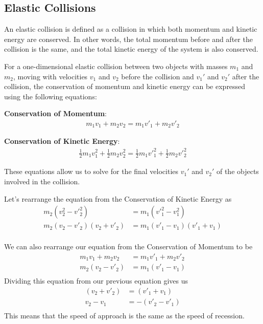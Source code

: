 \documentclass[11pt]{article}
\begin{document}
\subsection{Elastic Collisions}
An elastic collision is defined as a collision in which both momentum and kinetic energy are conserved. In other words, the total momentum before and after the collision is the same, and the total kinetic energy of the system is also conserved.

For a one-dimensional elastic collision between two objects with masses $m_1$ and $m_2$, moving with velocities $v_1$ and $v_2$ before the collision and $v_1'$ and $v_2'$ after the collision, the conservation of momentum and kinetic energy can be expressed using the following equations:

\textbf{Conservation of Momentum}:
\begin{align*}
    m_1v_1 + m_2v_2 = m_1v'_1 + m_2v'_2
\end{align*}

\textbf{Conservation of Kinetic Energy}:
\begin{align*}
    \frac{1}{2}m_1v_1^2 + \frac{1}{2}m_2v_2^2 = \frac{1}{2}m_1v'_1^2 + \frac{1}{2}m_2v'_2^2
\end{align*}

These equations allow us to solve for the final velocities $v_1'$ and $v_2'$ of the objects involved in the collision.

Let's rearrange the equation from the Conservation of Kinetic Energy as
\begin{align*}
    m_2(v_{2}^{2} - v'_{2}^{2}) &= m_1(v'_{1}^{2} - v_{1}^{2}) \\
    m_2(v_{2} - v'_{2})(v_2 + v'_2) &= m_1(v'_1 - v_1)(v'_1 + v_1) \\
\end{align*}

We can also rearrange our equation from the Conservation of Momentum to be
\begin{align*}
    m_1v_1 + m_2v_2 &= m_1v'_1 + m_2v'_2 \\
    m_2(v_2 - v'_2) &= m_1(v'_1 - v_1) \\
\end{align*}
Dividing this equation from our previous equation gives us
\begin{align*}
    (v_2 + v'_2) &= (v'_1 + v_1) \\
    v_2 - v_1 &= -(v'_2 - v'_1) \\
\end{align*}
This means that the speed of approach is the same as the speed of recession.
\end{document}
